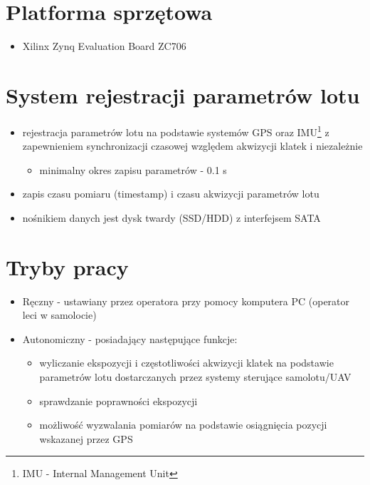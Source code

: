 \documentclass[a4paper,11pt,oneside]{report}  %
\begin{document}
\section{Platforma sprzętowa}
\begin{itemize}
\item Xilinx Zynq Evaluation Board ZC706 \cite{ZC706}
\end{itemize}

\section{System rejestracji parametrów lotu}

\begin{itemize}
\item rejestracja parametrów lotu na podstawie systemów GPS oraz IMU\footnote{IMU - Internal Management Unit} z zapewnieniem synchronizacji czasowej względem akwizycji klatek i niezależnie 
	\begin{itemize}
	\item minimalny okres zapisu parametrów - 0.1 s
	\end{itemize}
\item zapis czasu pomiaru (timestamp) i czasu akwizycji parametrów lotu
\item nośnikiem danych jest dysk twardy 
(SSD/HDD) z interfejsem SATA
\end{itemize}



\section{Tryby pracy}

\begin{itemize}
\item Ręczny - ustawiany przez operatora przy pomocy komputera PC (operator leci w samolocie)
\item Autonomiczny - posiadający następujące funkcje: 
	\begin{itemize}
		\item wyliczanie ekspozycji i częstotliwości akwizycji klatek na podstawie parametrów lotu dostarczanych przez systemy sterujące samolotu/UAV
		\item sprawdzanie poprawności ekspozycji
		\item możliwość wyzwalania pomiarów na podstawie osiągnięcia pozycji wskazanej przez GPS
	\end{itemize}
	
\end{itemize}
\end{document}
